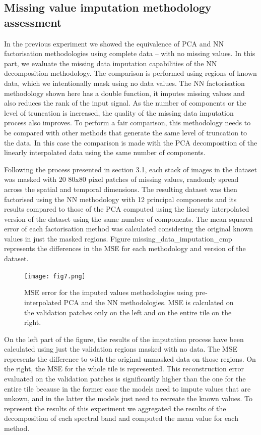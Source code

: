 \documentclass[essd, manuscript]{copernicus}
\begin{document}
\subsection{Missing value imputation methodology assessment}
In the previous experiment we showed the equivalence of PCA and NN factorisation methodologies using complete data -- with no missing values. In this part, we evaluate the missing data imputation capabilities of the NN decomposition methodology. The comparison is performed using regions of known data, which we intentionally mask using no data values. The NN factorisation methodology shown here has a double function, it imputes missing values and also reduces the rank of the input signal. As the number of components or the level of truncation is increased, the quality of the missing data imputation process also improves. To perform a fair comparison, this methodology needs to be compared with other methods that generate the same level of truncation to the data. In this case the comparison is made with the PCA decomposition of the linearly interpolated data using the same number of components. 

Following the process presented in section 3.1, each stack of images in the dataset was masked with 20 80x80 pixel patches of missing values, randomly spread across the spatial and temporal dimensions. The resulting dataset was then factorised using the NN methodology with 12 principal components and its results compared to those of the PCA computed using the linearly interpolated version of the dataset using the same number of components. The mean squared error of each factorisation method was calculated considering the original known values in just the masked regions. Figure {missing_data_imputation_cmp} represents the differences in the MSE for each methodology and version of the dataset.

\begin{figure}
    \texttt{[image: fig7.png]}
    \caption{MSE error for the imputed values methodologies using pre-interpolated PCA and the NN methodologies. MSE is calculated on the validation patches only on the left and on the entire tile on the right.}%
    \label{missing_data_imputation_cmp}%
\end{figure}

On the left part of the figure, the results of the imputation process have been calculated using just the validation regions masked with no data. The MSE represents the difference to with the original unmasked data on those regions. On the right, the MSE for the whole tile is represented. This reconstruction error evaluated on the validation patches is significantly higher than the one for the entire tile because in the former case the models need to impute values that are unkown, and in the latter the models just need to recreate the known values. To represent the results of this experiment we aggregated the results of the decomposition of each spectral band and computed the mean value for each method.
\end{document}
